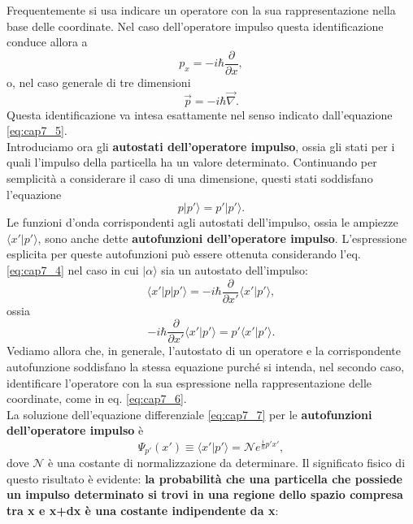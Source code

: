 \documentclass[a4paper,12pt,oneside]{book}
\begin{document}
Frequentemente si usa indicare un operatore con la sua rappresentazione nella base delle coordinate. Nel caso dell'operatore impulso questa identificazione conduce allora a
\begin{equation}
\label{eq:cap7_6}
p_x= -i\hbar \frac{\partial}{\partial x} ,
\end{equation}
o, nel caso generale di tre dimensioni
\begin{equation}
\vec{p}= -i\hbar \vec{\nabla}.
\end{equation}
Questa identificazione va intesa esattamente nel senso indicato dall'equazione \eqref{eq:cap7_5}.\\
Introduciamo ora gli \textbf{autostati dell'operatore impulso}, ossia gli stati per i quali l'impulso della particella ha un valore determinato. Continuando per semplicità a considerare il caso di una dimensione, questi stati soddisfano l'equazione
\begin{equation}
p | p' \rangle = p' | p' \rangle.
\end{equation}
Le funzioni d'onda corrispondenti agli autostati dell'impulso, ossia le ampiezze $\langle x' | p' \rangle$, sono anche dette \textbf{autofunzioni dell'operatore impulso}. L'espressione esplicita per queste autofunzioni può essere ottenuta considerando l'eq. \eqref{eq:cap7_4} nel caso in cui $| \alpha \rangle$ sia un autostato dell'impulso:
\begin{equation}
\langle x' | p | p' \rangle = -i \hbar \frac{\partial}{\partial x'} \langle x' | p' \rangle,
\end{equation}
\noindent ossia
\begin{equation}
\label{eq:cap7_7}
-i \hbar \frac{\partial}{\partial x'} \langle x' | p' \rangle = p' \langle x' | p' \rangle.
\end{equation}
Vediamo allora che, in generale, l'autostato di un operatore e la corrispondente autofunzione soddisfano la stessa equazione purché si intenda, nel secondo caso, identificare l'operatore con la sua espressione nella rappresentazione delle coordinate, come in eq. \eqref{eq:cap7_6}.\\
La soluzione dell'equazione differenziale \eqref{eq:cap7_7} per le \textbf{autofunzioni dell'operatore impulso} è
\begin{equation}
\label{eq:cap7_8}
\Psi_{p'}(x') \equiv \langle x' | p' \rangle = \mathcal{N} e^{\frac{i}{\hbar}p'x'},
\end{equation}
dove $\mathcal{N}$ è una costante di normalizzazione da determinare. Il significato fisico di questo risultato è evidente: \textbf{la probabilità che una particella che possiede un impulso determinato si trovi in una regione dello spazio compresa tra x e x+dx è una costante indipendente da x}:
\end{document}
